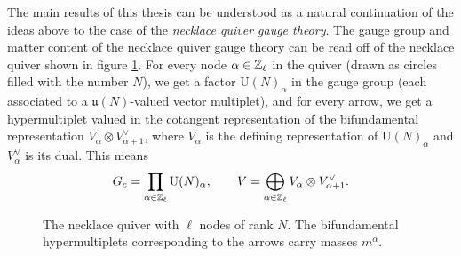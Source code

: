 The main results of this thesis can be understood as a natural continuation of the ideas above to the case of the \emph{necklace quiver gauge theory}. The gauge group and matter content of the necklace quiver gauge theory can be read off of the necklace quiver shown in figure \ref{fig:quiver}. For every node $\alpha \in \mathbb{Z}_\ell$ in the quiver (drawn as circles filled with the number $N$), we get a factor $\mathrm{U}(N)_\alpha$ in the gauge group (each associated to a $\mathfrak{u}(N)$-valued vector multiplet), and for every arrow, we get a hypermultiplet valued in the cotangent representation of the bifundamental representation $V_\alpha \otimes V_{\alpha+1}^\vee$, where $V_\alpha$ is the defining representation of $\mathrm{U}(N)_\alpha$ and $V_\alpha^\vee$ is its dual. This means
\begin{equation}
    G_c = \prod_{\alpha \in \mathbb{Z}_\ell} \mathrm{U}(N)_\alpha, \qquad V = \bigoplus_{\alpha \in \mathbb{Z}_\ell} V_\alpha \otimes V_{\alpha+1}^\vee.
\end{equation}
\begin{figure}[h]
    \centering
    \def\l{6}
    \def\radius{1.2cm}
    \caption[The necklace quiver]{The necklace quiver with $\ell$ nodes of rank $N$. The bifundamental hypermultiplets corresponding to the arrows carry masses $m^\alpha$.}
    \label{fig:quiver}
\end{figure}
